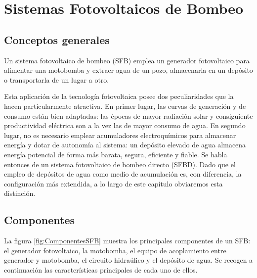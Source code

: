
\chapter{Sistemas Fotovoltaicos de Bombeo\label{cha:SFB}}




\section{Conceptos generales}

Un sistema fotovoltaico de bombeo (SFB) emplea un generador fotovoltaico
para alimentar una motobomba y extraer agua de un pozo, almacenarla
en un depósito o transportarla de un lugar a otro.   

Esta aplicación de la tecnología fotovoltaica posee dos peculiaridades
que la hacen particularmente atractiva. En primer lugar, las curvas
de generación y de consumo están bien adaptadas: las épocas de mayor
radiación solar y consiguiente productividad eléctrica son a la vez
las de mayor consumo de agua. En segundo lugar, no es necesario emplear
acumuladores electroquímicos para almacenar energía y dotar de autonomía
al sistema: un depósito elevado de agua almacena energía potencial
de forma más barata, segura, eficiente y fiable. Se habla entonces
de un sistema fotovoltaico de bombeo directo (SFBD). Dado que el empleo
de depósitos de agua como medio de acumulación es, con diferencia,
la configuración más extendida, a lo largo de este capítulo obviaremos
esta distinción.


\section{Componentes}

La figura \ref{fig:ComponentesSFB} muestra los principales componentes
de un SFB: el generador fotovoltaico, la motobomba, el equipo de acoplamiento
entre generador y motobomba, el circuito hidraúlico y el depósito
de agua. Se recogen a continuación las características principales
de cada uno de ellos.

